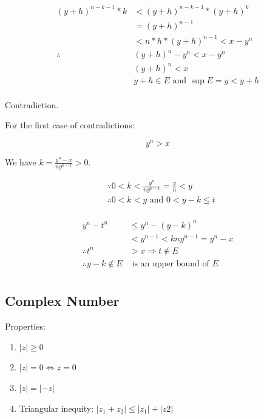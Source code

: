 \documentclass{article}
\begin{document}
    \begin{align*}
        (y + h)^{n - k - 1} * k &< (y + h)^{n - k - 1} * (y + h)^{k} \\
                                        &= (y + h)^{n - 1} \\
                                        &< n * h * (y + h)^{n - 1} < x - y^{n} \\
                                        \therefore &(y + h)^{n} - y^{n} < x - y^{n} \\
                                                        &(y + h)^{n} < x \\
                                                        &y + h \in E \text{ and } \sup E = y < y + h \\
    \end{align*}
    
    Contradiction.
    
    For the first case of contradictions:
    
    \begin{displaymath}
        y^{n} > x
    \end{displaymath}
    
    We have $k = \frac{y^{n} - x}{ny^{n - 1}} > 0$.
    
    \begin{align*}
        &\because 0 < k < \frac{y^{n}}{ny^{n - 1}} = \frac{y}{n} < y \\
        &\therefore 0 < k < y \text{ and } 0 < y - k \leq t \\
    \end{align*}
    
    \begin{align*}
        y^{n} - t^{n} &\leq y^{n} - (y - k)^{n} \\
                           &< y^{n - 1} < kny^{n - 1} = y^{n} - x \\
        \therefore t^{n} &> x \Rightarrow t \notin E \\
        \therefore y - k \notin E &\text{ is an upper bound of } E \\
    \end{align*}
    
    \subsection{Complex Number}
    
    Properties:
    
    \begin{enumerate}
        \item $\left| z \right| \geq 0$
        \item $\left| z \right| = 0 \iff z = 0$
        \item $\left| z \right| = \left| -z \right|$
        \item Triangular inequity: $\left| z_{1} + z_{2} \right| \leq \left| z_{1} \right| + \left| z{2} \right|$
    \end{enumerate}
    
\end{document}
